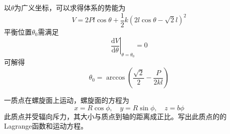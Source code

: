 \begin{solution}
以$\theta$为广义坐标，可以求得体系的势能为
\begin{equation*}
	V = 2Pl\cos \theta + \frac12 k\left(2l\cos \theta - \sqrt{2}l\right)^2 
\end{equation*}
平衡位置$\theta_0$需满足
\begin{equation*}
	\left.\frac{\mathrm{d} V}{\mathrm{d} \theta} \right|_{\theta=\theta_0} = 0
\end{equation*}
可解得
\begin{equation*}
	\theta_0 = \arccos\left(\frac{\sqrt{2}}{2} - \frac{P}{2kl}\right)
\end{equation*}
\end{solution}

\begin{question}
一质点在螺旋面上运动，螺旋面的方程为
\begin{equation*}
	x = R\cos \phi,\quad y = R\sin \phi,\quad z = b\phi
\end{equation*}
此质点并受辐向斥力，其大小与质点到轴的距离成正比。写出此质点的的Lagrange函数和运动方程。
\end{question}

